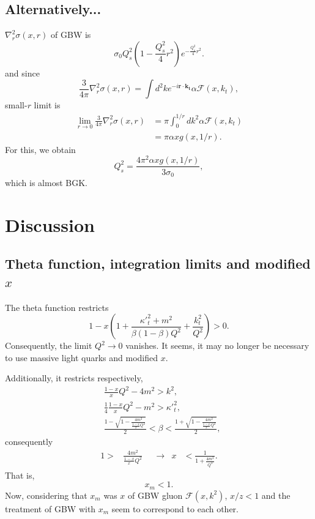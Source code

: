 \documentclass[12pt]{article}
\begin{document}
\subsection{Alternatively...}
$\nabla^2_r\sigma(x,r)$
 of GBW is 
\begin{equation}
\sigma_0 Q_s^2 \left(1-\frac{Q_s^2}{4}r^2\right)e^{-\frac{Q_s^2}{4}r^2}.
\end{equation}
and since
\begin{equation}
	\frac{3}{4\pi} \nabla^2_r\sigma(x,r)=\int d^2ke^{-i\mathbf{r}\cdot\mathbf{k_t}}\alpha \mathcal{F}(x,k_t),
\end{equation}
small-$r$ limit is
\begin{equation}
\begin{split}
	\lim_{r\rightarrow0}\frac{3}{4\pi} \nabla^2_r\sigma(x,r)&=\pi \int^{1/r}_0 dk^2\alpha \mathcal{F}(x,k_t)\\
&=\pi \alpha xg(x,1/r).
\end{split}
\end{equation}
For this, we obtain 
\begin{equation}
Q_s^2=\frac{4\pi^2 \alpha x g(x,1/r)}{3\sigma_0},
\end{equation}
which is almost BGK. 



\section{Discussion}
\subsection{Theta function, integration limits and modified $x$}
The theta function restricts
\begin{equation}
1-x\left(1+\frac{{\kappa'}_t^2+m^2}{\beta(1-\beta)Q^2}+\frac{k_t^2}{Q^2}\right)>0.
\end{equation}
Consequently, the limit $Q^2\rightarrow0$ vanishes.
It seems, it may no longer be necessary to use massive light quarks and modified $x$.

Additionally, it restricts respectively,
\begin{align}
&\frac{1-x}{x}Q^2-4m^2>k^2,\\
&\frac{1}{4} \frac{1-x}{x}Q^2-m^2>{\kappa'}_t^2,\\
&\frac{1-\sqrt{1-\frac{4m^2}{\frac{1-x}{x} Q^2  }}}{2}<\beta< \frac{1+\sqrt{1-\frac{4m^2}{\frac{1-x}{x} Q^2  }}}{2},
\end{align}
consequently
\begin{align}
1>&\frac{4m^2}{\frac{1-x}{x} Q^2 }&& \rightarrow& x&<\frac{1}{1+\frac{4m^2}{Q^2}}.
\end{align}
That is, 
\begin{equation}
x_{m}<1.
\end{equation}
Now, considering that $x_m$ was $x$ of GBW gluon $\mathcal{F}(x,k^2)$, $x/z<1$ and the treatment of GBW with $x_m$ seem to correspond to each other.
\end{document}
